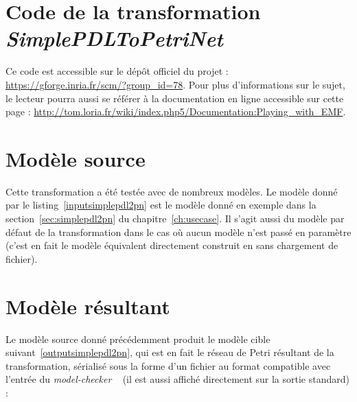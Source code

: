 \appendix
\section{Code de la transformation \emph{SimplePDLToPetriNet}}
\label{annexe:pdl2pn}

Ce code est accessible sur le dépôt officiel du projet {\tom} :
\url{https://gforge.inria.fr/scm/?group\_id=78}. Pour plus d'informations sur le
sujet, le lecteur pourra aussi se référer à la documentation en ligne
accessible sur cette page
: \url{http://tom.loria.fr/wiki/index.php5/Documentation:Playing\_with\_EMF}.



\section{Modèle source}
\label{annexe:pdl2pn:msrc}
%  

Cette transformation a été testée avec de nombreux modèles. Le modèle donné par
le listing~\ref{inputsimplepdl2pn} est le modèle donné en exemple dans la
section~\ref{sec:simplepdl2pn} du chapitre~\ref{ch:usecase}. Il s'agit aussi du
modèle par défaut de la transformation dans le cas où aucun modèle n'est passé
en paramètre (c'est en fait le modèle équivalent directement construit en
{\tom} sans chargement de fichier).


%

\section{Modèle résultant}
\label{annexe:pdl2pn:mtgt}
%

Le modèle source donné précédemment produit le modèle cible
suivant~\ref{outputsimplepdl2pn}, qui est en fait le réseau de Petri résultant
de la transformation, sérialisé sous la forme d'un fichier au format compatible
avec l'entrée du \emph{model-checker} {\tina}~\cite{Berthomieu2004} (il est
aussi affiché directement sur la sortie standard) :

